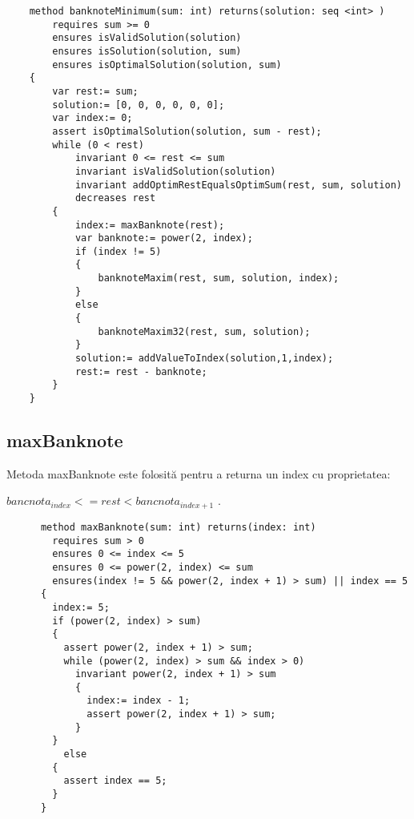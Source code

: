     \begin{lstlisting}
    method banknoteMinimum(sum: int) returns(solution: seq <int> )
        requires sum >= 0
        ensures isValidSolution(solution)
        ensures isSolution(solution, sum)
        ensures isOptimalSolution(solution, sum) 
    {
        var rest:= sum;
        solution:= [0, 0, 0, 0, 0, 0];
        var index:= 0;
        assert isOptimalSolution(solution, sum - rest);
        while (0 < rest)
            invariant 0 <= rest <= sum
            invariant isValidSolution(solution)
            invariant addOptimRestEqualsOptimSum(rest, sum, solution)
            decreases rest 
        {
            index:= maxBanknote(rest);
            var banknote:= power(2, index);
            if (index != 5) 
            {
                banknoteMaxim(rest, sum, solution, index);
            } 
            else 
            {
                banknoteMaxim32(rest, sum, solution);
            }
            solution:= addValueToIndex(solution,1,index);
            rest:= rest - banknote;
        }
    }
    \end{lstlisting}

    \subsection{maxBanknote}
    Metoda maxBanknote este folosită pentru a returna un index cu proprietatea: \par
     $bancnota_{index} <= rest < bancnota_{index + 1}$  .\par
    \begin{lstlisting}
      method maxBanknote(sum: int) returns(index: int)
        requires sum > 0
        ensures 0 <= index <= 5
        ensures 0 <= power(2, index) <= sum
        ensures(index != 5 && power(2, index + 1) > sum) || index == 5 
      {
        index:= 5;
        if (power(2, index) > sum) 
        {
          assert power(2, index + 1) > sum;
          while (power(2, index) > sum && index > 0)
            invariant power(2, index + 1) > sum 
            {
              index:= index - 1;
              assert power(2, index + 1) > sum;
            }
        } 
          else 
        {
          assert index == 5;
        }
      }
    \end{lstlisting}


